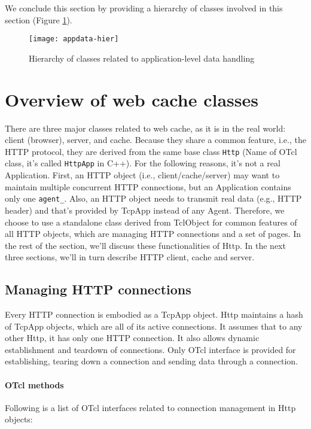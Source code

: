 We conclude this section by providing a hierarchy of classes involved
in this section (Figure \ref{fig:appdata-hier}).

\begin{figure}[tb]
  \begin{center}
    \texttt{[image: appdata-hier]}
    \caption{Hierarchy of classes related to application-level data handling}
    \label{fig:appdata-hier}
  \end{center}
\end{figure}


\section{Overview of web cache classes}
\label{sec:webcache-class}

There are three major classes related to web cache, as it is in the
real world: client (browser), server, and cache. Because they share a
common feature, i.e., the HTTP protocol, they are derived from the
same base class {\tt Http} (Name of OTcl class, it's called
{\tt HttpApp} in C++). For the following reasons, it's not a real
Application.  First, an HTTP object (i.e., client/cache/server) may
want to maintain multiple concurrent HTTP connections, but an
Application contains only one {\tt agent\_}.  Also, an HTTP object
needs to transmit real data (e.g., HTTP header) and that's provided by
TcpApp instead of any Agent. Therefore, we choose to use a standalone
class derived from TclObject for common features of all HTTP objects,
which are managing HTTP connections and a set of pages.  In the rest
of the section, we'll discuss these functionalities of Http. In the
next three sections, we'll in turn describe HTTP client, cache and
server.

\subsection{Managing HTTP connections}
\label{sec:webcache-connection}

Every HTTP connection is embodied as a TcpApp
object. Http maintains a hash of TcpApp objects, which are all of 
its active connections. It assumes that to any other Http, it 
has only one HTTP connection. It also allows dynamic establishment and 
teardown of connections. Only OTcl interface is provided for establishing,
tearing down a connection and sending data through a connection.

\paragraph{OTcl methods}
Following is a list of OTcl interfaces related to connection management 
in Http objects:

